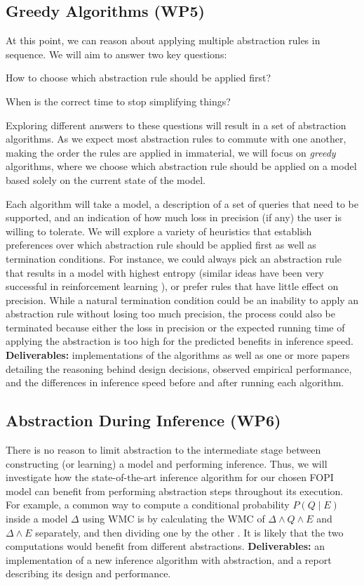 \documentclass[11pt,english,twocolumn]{article}
\begin{document}
\subsection*{Greedy Algorithms (WP5)}

At this point, we can reason about applying multiple abstraction rules in
sequence. We will aim to answer two key questions:
\begin{itemize*}
\item How to choose which abstraction rule should be applied first?
\item When is the correct time to stop simplifying things?
\end{itemize*}
Exploring different answers to these questions will result in a set of
abstraction algorithms. As we expect most abstraction rules to commute with one
another, making the order the rules are applied in immaterial, we will focus on
\emph{greedy} algorithms, where we choose which abstraction rule should be
applied on a model based solely on the current state of the model.

Each algorithm will take a model, a description of a set of queries that need to
be supported, and an indication of how much loss in precision (if any) the user
is willing to tolerate. We will explore a variety of heuristics that establish
preferences over which abstraction rule should be applied first as well as
termination conditions. For instance, we could always pick an abstraction rule
that results in a model with highest entropy (similar ideas have been very
successful in reinforcement learning \cite{DBLP:conf/aaai/ZiebartMBD08}), or
prefer rules that have little effect on precision. While a natural termination
condition could be an inability to apply an abstraction rule without losing too
much precision, the process could also be terminated because either the loss in
precision or the expected running time of applying the abstraction is too high
for the predicted benefits in inference speed. \textbf{Deliverables:}
implementations of the algorithms as well as one or more papers detailing the
reasoning behind design decisions, observed empirical performance, and the
differences in inference speed before and after running each algorithm.

\subsection*{Abstraction During Inference (WP6)}

There is no reason to limit abstraction to the intermediate stage between
constructing (or learning) a model and performing inference. Thus, we will
investigate how the state-of-the-art inference algorithm for our chosen FOPI
model can benefit from performing abstraction steps throughout its execution.
For example, a common way to compute a conditional probability $P(Q \mid E)$
inside a model $\Delta$ using WMC is by calculating the WMC of $\Delta \land Q
\land E$ and $\Delta \land E$ separately, and then dividing one by the other
\cite{DBLP:journals/ai/ChaviraD08}. It is likely that the two computations would
benefit from different abstractions. \textbf{Deliverables:} an implementation of a
new inference algorithm with abstraction, and a report describing its design and
performance.
\end{document}
